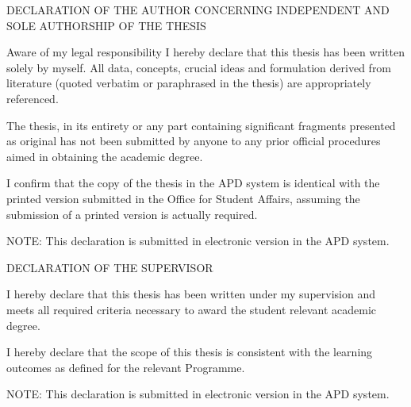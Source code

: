 DECLARATION OF THE AUTHOR CONCERNING INDEPENDENT AND SOLE AUTHORSHIP OF THE THESIS 

Aware of my legal responsibility I hereby declare that this thesis has been written solely by myself.  All data, concepts, crucial ideas and formulation derived from literature (quoted verbatim or paraphrased in the thesis) are appropriately referenced. 

The thesis, in its entirety or any part containing significant fragments presented as original has not been submitted by anyone to any prior official procedures aimed in obtaining the academic degree.  

I confirm that the copy of the thesis in the APD system is identical with the printed version submitted in the Office for Student Affairs, assuming the submission of a printed version is actually required. 

NOTE: This declaration is submitted in electronic version in the APD system. 

DECLARATION OF THE SUPERVISOR  

I hereby declare that this thesis has been written under my supervision and meets all required criteria necessary to award the student relevant academic degree. 

I hereby declare that the scope of this thesis is consistent with the learning outcomes as defined for the relevant Programme.  

NOTE: This declaration is submitted in electronic version in the APD system. 